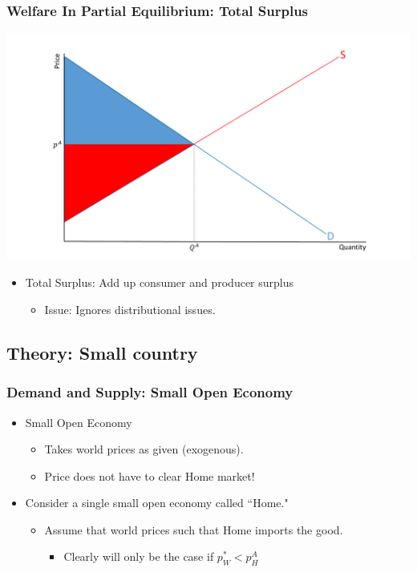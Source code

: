 \documentclass{beamer}
\begin{document}
\begin{frame}
	\frametitle{Welfare In Partial Equilibrium: Total Surplus}
		\includegraphics[scale=0.30]{SL_4.pdf}
	\begin{itemize}
		\item Total Surplus: Add up consumer and producer surplus
		\begin{itemize}
			\item Issue: Ignores distributional issues.
		\end{itemize}
	\end{itemize}
\end{frame}

\subsection{Theory: Small country}

\begin{frame}
	\frametitle{Demand and Supply: Small Open Economy}
	\begin{itemize}
		\item  Small Open Economy
			\begin{itemize}
				\item Takes world prices as given (exogenous).
				\item Price does not have to clear Home market!
			\end{itemize}
		\item Consider a single small open economy called ``Home." 
			\begin{itemize} 
				\item Assume that world prices such that Home imports the good.
					\begin{itemize}
						\item Clearly will only be the case if $p^*_W<p^A_H$
					\end{itemize}
			\end{itemize}
	\end{itemize}
\end{frame}
\end{document}
